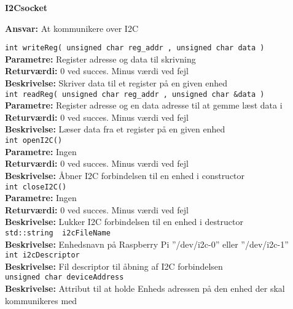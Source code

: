 {\centering
\textbf{I2Csocket}\par
}
\textbf{Ansvar:} At kommunikere over I2C \

\verb+int writeReg( unsigned char reg_addr , unsigned char data ) +\\
\textbf{Parametre:}   Register adresse og data til skrivning \\
\textbf{Returværdi:}  0 ved succes. Minus værdi ved fejl \\
\textbf{Beskrivelse:} Skriver data til et register på en given enhed \\

\verb+int readReg( unsigned char reg_addr , unsigned char &data ) +\\
\textbf{Parametre:}   Register adresse og en data adresse til at gemme læst data i \\
\textbf{Returværdi:}  0 ved succes. Minus værdi ved fejl \\
\textbf{Beskrivelse:} Læser data fra et register på en given enhed \\

\verb+int openI2C() +\\
\textbf{Parametre:}   Ingen \\
\textbf{Returværdi:}  0 ved succes. Minus værdi ved fejl \\
\textbf{Beskrivelse:} Åbner I2C forbindelsen til en enhed i constructor \\

\verb+int closeI2C() +\\
\textbf{Parametre:}   Ingen \\
\textbf{Returværdi:}  0 ved succes. Minus værdi ved fejl \\
\textbf{Beskrivelse:} Lukker I2C forbindelsen til en enhed i destructor \\

\verb+std::string  i2cFileName +\\
\textbf{Beskrivelse:} Enhedsnavn på Raspberry Pi ''/dev/i2c-0'' eller ''/dev/i2c-1'' \\

\verb+int i2cDescriptor +\\
\textbf{Beskrivelse:} Fil descriptor til åbning af I2C forbindelsen \\

\verb+unsigned char deviceAddress +\\
\textbf{Beskrivelse:} Attribut til at holde Enheds adressen på den enhed der skal kommunikeres med  \\

